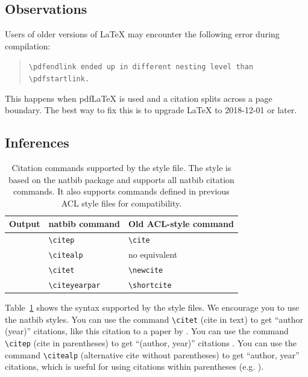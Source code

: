 \documentclass[9pt]{article}
\begin{document}
\subsection{Observations}

Users of older versions of \LaTeX{} may encounter the following error during compilation: 
\begin{quote}
\tt\verb|\pdfendlink| ended up in different nesting level than \verb|\pdfstartlink|.
\end{quote}
This happens when pdf\LaTeX{} is used and a citation splits across a page boundary. The best way to fix this is to upgrade \LaTeX{} to 2018-12-01 or later.

\subsection{Inferences}

\begin{table}
\centering
\begin{tabular}{lll}
\hline
\textbf{Output} & \textbf{natbib command} & \textbf{Old ACL-style command}\\
\hline
\citep{Gusfield:97} & \verb|\citep| & \verb|\cite| \\
\citealp{Gusfield:97} & \verb|\citealp| & no equivalent \\
\citet{Gusfield:97} & \verb|\citet| & \verb|\newcite| \\
\citeyearpar{Gusfield:97} & \verb|\citeyearpar| & \verb|\shortcite| \\
\hline
\end{tabular}
\caption{\label{citation-guide}
Citation commands supported by the style file.
The style is based on the natbib package and supports all natbib citation commands.
It also supports commands defined in previous ACL style files for compatibility.
}
\end{table}

Table~\ref{citation-guide} shows the syntax supported by the style files.
We encourage you to use the natbib styles.
You can use the command \verb|\citet| (cite in text) to get ``author (year)'' citations, like this citation to a paper by \citet{Gusfield:97}.
You can use the command \verb|\citep| (cite in parentheses) to get ``(author, year)'' citations \citep{Gusfield:97}.
You can use the command \verb|\citealp| (alternative cite without parentheses) to get ``author, year'' citations, which is useful for using citations within parentheses (e.g. \citealp{Gusfield:97}).
\end{document}
